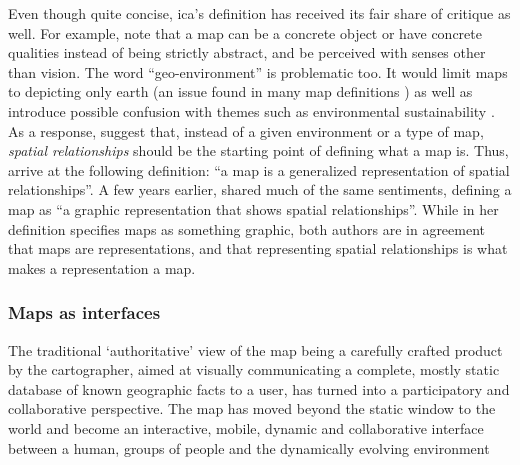 Even though quite concise,
\acrshort{ica}'s definition has received its fair share of critique as well.
For example, \textcite{lap2021} note that
a map can be a concrete object or have concrete qualities
instead of being strictly abstract,
and be perceived with senses other than vision.
The word \enquote{geo-environment} is problematic too.
It would limit maps to depicting only earth
(an issue found in many map definitions \parencite{tyn2014})
as well as introduce possible confusion with themes such as
environmental sustainability \parencite{lap2021}.
As a response, \textcite{lap2021} suggest that,
instead of a given environment or a type of map,
\textit{spatial relationships} should be the starting point of defining what a map is.
Thus, \citeauthor{lap2021} arrive at the following definition:
\enquote{a map is a generalized representation of spatial relationships}.
A few years earlier, \textcite{tyn2014} shared much of the same sentiments,
defining a map as \enquote{a graphic representation that shows spatial relationships}.
While in her definition \citeauthor{tyn2014} specifies maps as something graphic,
both authors are in agreement that maps are representations,
and that representing spatial relationships is what makes a representation a map.


\subsubsection{Maps as interfaces}

\parencite{kra2017}
The traditional ‘authoritative’ view of the map being a carefully crafted product
by the cartographer, aimed at visually communicating a complete, mostly static database
of known geographic facts to a user, has turned into a participatory and collaborative perspective.
The map has moved beyond the static window to the world and become an
interactive, mobile, dynamic and collaborative interface between a human, groups of
people and the dynamically evolving environment


